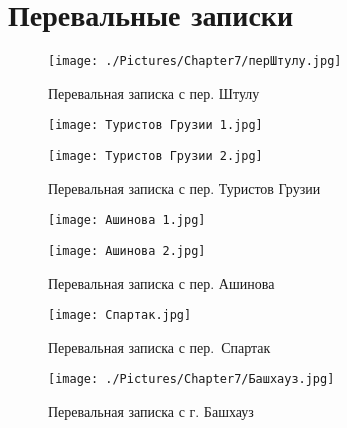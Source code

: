 \graphicspath{ {./Pictures/Chapter7/} }

\section{Перевальные записки}\label{sec:notes}
    \begin{figure}[ht]\label{fig:pass_notes_shtulu}
        \centering
        \texttt{[image: ./Pictures/Chapter7/перШтулу.jpg]}
        \caption{Перевальная записка с пер. Штулу}
    \end{figure}
    
    \begin{figure}[ht]\label{fig:pass_notes_turists_gergia}
        \begin{center}
            \begin{minipage}[h]{0.5\linewidth}
                \texttt{[image: Туристов Грузии 1.jpg]}
            \end{minipage}%
            \begin{minipage}[h]{0.5\linewidth}
                \texttt{[image: Туристов Грузии 2.jpg]}
            \end{minipage}
        \end{center}
        \caption{Перевальная записка с пер. Туристов Грузии}
    \end{figure}

    \begin{figure}[ht]\label{fig:pass_notes_ashinova}
        \begin{center}
            \begin{minipage}[h]{0.5\linewidth}
                \texttt{[image: Ашинова 1.jpg]}
            \end{minipage}%
            \begin{minipage}[h]{0.5\linewidth}
                \texttt{[image: Ашинова 2.jpg]}
            \end{minipage}
        \end{center}
        \caption{Перевальная записка с пер. Ашинова}
    \end{figure}

    \begin{figure}[ht]
        \begin{center}
            \begin{minipage}[h]{0.5\linewidth}\label{fig:pass_notes_spartak}
                \texttt{[image: Спартак.jpg]}
                \caption{Перевальная записка с пер.~Спартак}
            \end{minipage}%
            \begin{minipage}[h]{0.5\linewidth}\label{fig:pass_notes_bashhouse}
                \texttt{[image: ./Pictures/Chapter7/Башхауз.jpg]}
                \caption{Перевальная записка с г. Башхауз}
            \end{minipage}
        \end{center}
    \end{figure}

